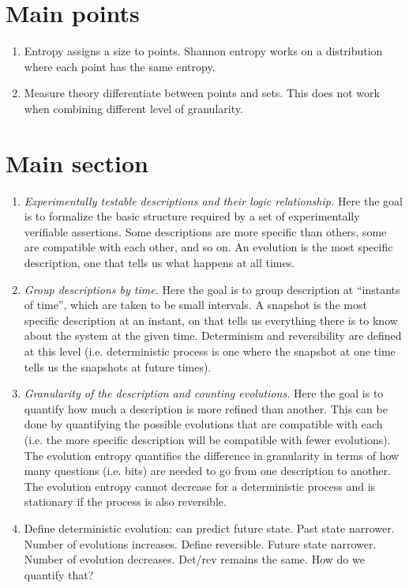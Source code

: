 \documentclass[letterpaper]{article}
\begin{document}
\section{Main points}
\begin{enumerate}
	\item Entropy assigns a size to points. Shannon entropy works on a distribution where each point has the same entropy.
	\item Measure theory differentiate between points and sets. This does not work when combining different level of granularity.
\end{enumerate}

\section{Main section}
\begin{enumerate}
	\item \emph{Experimentally testable descriptions and their logic relationship.} Here the goal is to formalize the basic structure required by a set of experimentally verifiable assertions. Some descriptions are more specific than others, some are compatible with each other, and so on. An evolution is the most specific description, one that tells us what happens at all times.
	\item \emph{Group descriptions by time.} Here the goal is to group description at ``instants of time'', which are taken to be small intervals. A snapshot is the most specific description at an instant, on that tells us everything there is to know about the system at the given time. Determinism and reversibility are defined at this level (i.e. deterministic process is one where the snapshot at one time tells us the snapshots at future times).
	\item \emph{Granularity of the description and counting evolutions.} Here the goal is to quantify how much a description is more refined than another. This can be done by quantifying the possible evolutions that are compatible with each (i.e. the more specific description will be compatible with fewer evolutions). The evolution entropy quantifies the difference in granularity in terms of how many questions (i.e. bits) are needed to go from one description to another. The evolution entropy cannot decrease for a deterministic process and is stationary if the process is also reversible.
	\item Define deterministic evolution: can predict future state. Past state narrower. Number of evolutions increases. Define reversible. Future state narrower. Number of evolution decreases. Det/rev remains the same. How do we quantify that?

\end{enumerate}
\end{document}
